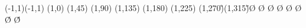\begin{zahyou*}[ul=2.5zw](-1,1)(-1,1)%
\kyokuTyoku(1,0)\A%
\kyokuTyoku(1,45)\B%
\kyokuTyoku(1,90)\C%
\kyokuTyoku(1,135)\D%
\kyokuTyoku(1,180)\E%
\kyokuTyoku(1,225)\F%
\kyokuTyoku(1,270)\G%
\kyokuTyoku(1,315)\H%
\ArrowLine\A\O
\ArrowLine\B\O
\ArrowLine\C\O
\ArrowLine\D\O
\ArrowLine\E\O
\ArrowLine\F\O
\ArrowLine\G\O
\ArrowLine\H\O
\end{zahyou*}
